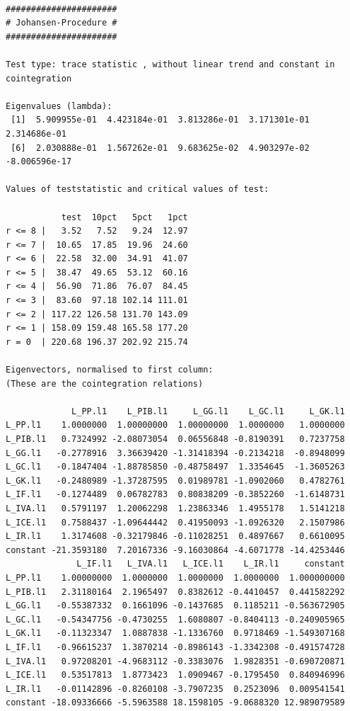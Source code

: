 \documentclass[
  spanish,
  letterpaper,
  DIV=11,
  numbers=noendperiod]{scrartcl}
\begin{document}
\begin{verbatim}

###################### 
# Johansen-Procedure # 
###################### 

Test type: trace statistic , without linear trend and constant in cointegration 

Eigenvalues (lambda):
 [1]  5.909955e-01  4.423184e-01  3.813286e-01  3.171301e-01  2.314686e-01
 [6]  2.030888e-01  1.567262e-01  9.683625e-02  4.903297e-02 -8.006596e-17

Values of teststatistic and critical values of test:

           test  10pct   5pct   1pct
r <= 8 |   3.52   7.52   9.24  12.97
r <= 7 |  10.65  17.85  19.96  24.60
r <= 6 |  22.58  32.00  34.91  41.07
r <= 5 |  38.47  49.65  53.12  60.16
r <= 4 |  56.90  71.86  76.07  84.45
r <= 3 |  83.60  97.18 102.14 111.01
r <= 2 | 117.22 126.58 131.70 143.09
r <= 1 | 158.09 159.48 165.58 177.20
r = 0  | 220.68 196.37 202.92 215.74

Eigenvectors, normalised to first column:
(These are the cointegration relations)

             L_PP.l1    L_PIB.l1     L_GG.l1    L_GC.l1     L_GK.l1
L_PP.l1    1.0000000  1.00000000  1.00000000  1.0000000   1.0000000
L_PIB.l1   0.7324992 -2.08073054  0.06556848 -0.8190391   0.7237758
L_GG.l1   -0.2778916  3.36639420 -1.31418394 -0.2134218  -0.8948099
L_GC.l1   -0.1847404 -1.88785850 -0.48758497  1.3354645  -1.3605263
L_GK.l1   -0.2480989 -1.37287595  0.01989781 -1.0902060   0.4782761
L_IF.l1   -0.1274489  0.06782783  0.80838209 -0.3852260  -1.6148731
L_IVA.l1   0.5791197  1.20062298  1.23863346  1.4955178   1.5141218
L_ICE.l1   0.7588437 -1.09644442  0.41950093 -1.0926320   2.1507986
L_IR.l1    1.3174608 -0.32179846 -0.11028251  0.4897667   0.6610095
constant -21.3593180  7.20167336 -9.16030864 -4.6071778 -14.4253446
              L_IF.l1   L_IVA.l1   L_ICE.l1    L_IR.l1     constant
L_PP.l1    1.00000000  1.0000000  1.0000000  1.0000000  1.000000000
L_PIB.l1   2.31180164  2.1965497  0.8382612 -0.4410457  0.441582292
L_GG.l1   -0.55387332  0.1661096 -0.1437685  0.1185211 -0.563672905
L_GC.l1   -0.54347756 -0.4730255  1.6080807 -0.8404113 -0.240905965
L_GK.l1   -0.11323347  1.0887838 -1.1336760  0.9718469 -1.549307168
L_IF.l1   -0.96615237  1.3870214 -0.8986143 -1.3342308 -0.491574728
L_IVA.l1   0.97208201 -4.9683112 -0.3383076  1.9828351 -0.690720871
L_ICE.l1   0.53517813  1.8773423  1.0909467 -0.1795450  0.840946996
L_IR.l1   -0.01142896 -0.8260108 -3.7907235  0.2523096  0.009541541
constant -18.09336666 -5.5963588 18.1598105 -9.0688320 12.989079589


\end{verbatim}
\end{document}
